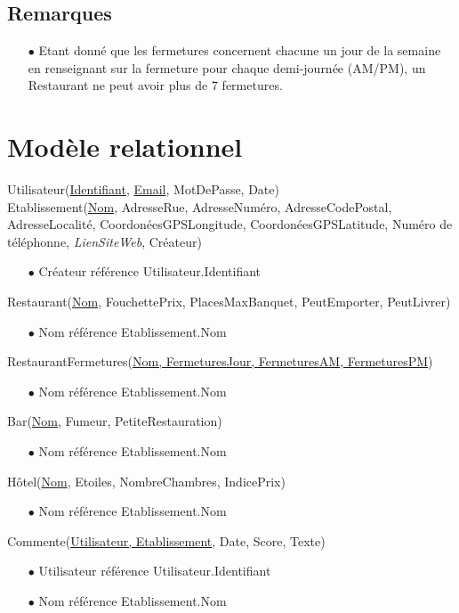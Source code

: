 \documentclass[a4paper, 11pt]{article}
\begin{document}
\subsection*{Remarques}
\begin{itemize}
	\item[$\bullet$] Etant donné que les fermetures concernent chacune un jour de la semaine en renseignant sur la fermeture pour chaque demi-journée (AM/PM), un Restaurant ne peut avoir plus de 7 fermetures. 
\end{itemize}

\section*{Modèle relationnel}
\noindent
Utilisateur(\underline{Identifiant}, \underline{Email}, MotDePasse, Date)\\
Etablissement(\underline{Nom}, AdresseRue, AdresseNuméro, AdresseCodePostal, AdresseLocalité, CoordonéesGPSLongitude, CoordonéesGPSLatitude, Numéro de téléphonne, \textit{LienSiteWeb}, Créateur)
\begin{itemize}
	\item[$\bullet$] Créateur référence Utilisateur.Identifiant
\end{itemize}
Restaurant(\underline{Nom}, FouchettePrix, PlacesMaxBanquet, PeutEmporter, PeutLivrer)
\begin{itemize}
	\item[$\bullet$] Nom référence Etablissement.Nom
\end{itemize}
RestaurantFermetures(\underline{Nom, FermeturesJour, FermeturesAM, FermeturesPM})
\begin{itemize}
	\item[$\bullet$] Nom référence Etablissement.Nom
\end{itemize}
Bar(\underline{Nom}, Fumeur, PetiteRestauration)
\begin{itemize}
	\item[$\bullet$] Nom référence Etablissement.Nom
\end{itemize}
Hôtel(\underline{Nom}, Etoiles, NombreChambres, IndicePrix)
\begin{itemize}
	\item[$\bullet$] Nom référence Etablissement.Nom
\end{itemize}
Commente(\underline{Utilisateur, Etablissement}, Date, Score, Texte)
\begin{itemize}
	\item[$\bullet$] Utilisateur référence Utilisateur.Identifiant
	\item[$\bullet$] Nom référence Etablissement.Nom
\end{itemize}
\end{document}
